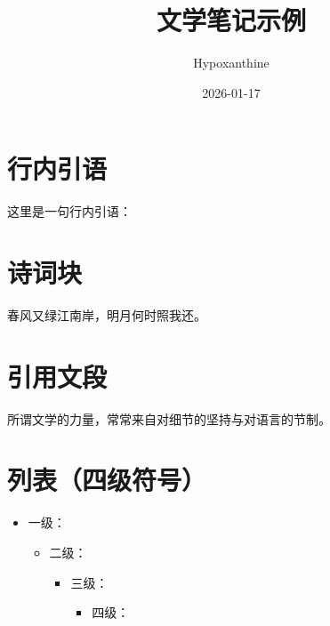 \documentclass[lists=true,litbox=true]{Hypo-LitNote}
\title{文学笔记示例}
\author{Hypoxanthine}
\date{2026-01-17}
\begin{document}
\maketitle
\tableofcontents

\section{行内引语}
这里是一句行内引语：

\section{诗词块}
\begin{poem}[title={短诗}]
春风又绿江南岸，明月何时照我还。
\end{poem}

\section{引用文段}
\begin{quotepara}[title={摘录}]
所谓文学的力量，常常来自对细节的坚持与对语言的节制。
\end{quotepara}

\section{列表（四级符号）}
\begin{itemize}
  \item 一级：
  \begin{itemize}
    \item 二级：
    \begin{itemize}
      \item 三级：
      \begin{itemize}
        \item 四级：
      \end{itemize}
    \end{itemize}
  \end{itemize}
\end{itemize}
\end{document}

